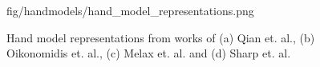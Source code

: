 \begin{figure}[b]
\centering
\begin{overpic} 
[width=\linewidth]
{fig/handmodels/hand_model_representations.png}
\end{overpic}
\caption{Hand model representations from works of (a) Qian et. al., (b)  Oikonomidis et. al., (c) Melax et. al.  and (d) Sharp et. al. }
\label{fig:hand_model_representations}
\end{figure}

